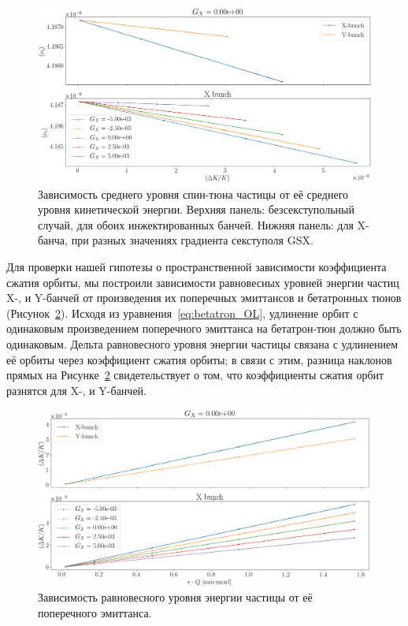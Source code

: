 \begin{figure}[h]
	\centering
	\includegraphics[height=.3\paperheight]{images/stune_traj_equ/part1/stune_vs_equ_energy}
	\caption[Зависимость среднего уровня спин-тюна частицы от её среднего уровня кинетической энергии.]{Зависимость среднего уровня спин-тюна частицы от её среднего уровня кинетической энергии. Верхняя панель: безсекступольный случай, для обоих инжектированных банчей. Нижняя панель: для X-банча, при разных значениях градиента секступоля GSX.\label{fig:stune_traj_equ_main}}
\end{figure}

Для проверки нашей гипотезы о пространственной зависимости коэффициента сжатия орбиты, мы построили зависимости равновесных уровней энергии частиц X-, и Y-банчей от произведения их поперечных эмиттансов и бетатронных тюнов (Рисунок~\ref{fig:equ_nrg_vs_emittance}). Исходя из уравнения~\eqref{eq:betatron_OL}, удлинение орбит с одинаковым произведением поперечного эмиттанса на бетатрон-тюн должно быть одинаковым. Дельта равновесного уровня энергии частицы связана с удлинением её орбиты через коэффициент сжатия орбиты; в связи с этим, разница наклонов прямых на Рисунке~\ref{fig:equ_nrg_vs_emittance} свидетельствует о том, что коэффициенты сжатия орбит разнятся для X-, и Y-банчей. 

\begin{figure}[h]
	\centering
	\includegraphics[height=.3\paperheight]{images/stune_traj_equ/part1/equ_energy_vs_emittance}
	\caption{Зависимость равновесного уровня энергии частицы от её поперечного эмиттанса.\label{fig:equ_nrg_vs_emittance}}
\end{figure}

